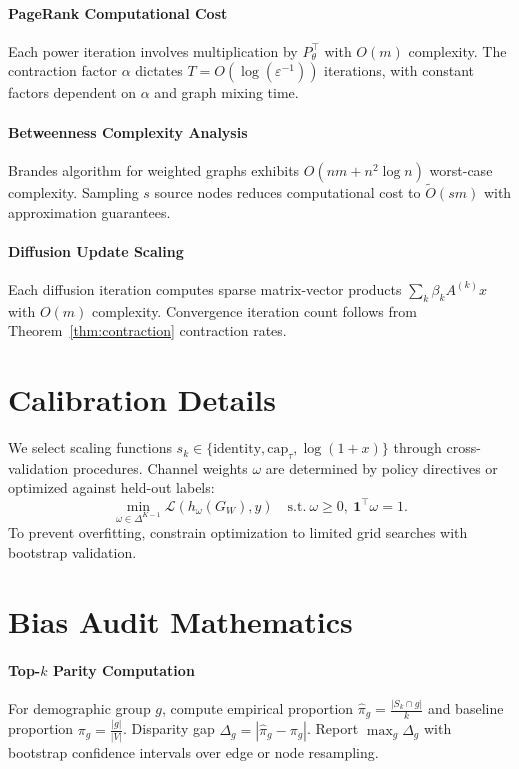 \documentclass[12pt]{article}
\theoremstyle{plain}
\begin{document}
\paragraph{PageRank Computational Cost}
Each power iteration involves multiplication by $P_\theta^\top$ with $O(m)$ complexity. The contraction factor $\alpha$ dictates $T=O(\log(\varepsilon^{-1}))$ iterations, with constant factors dependent on $\alpha$ and graph mixing time.

\paragraph{Betweenness Complexity Analysis}
Brandes algorithm for weighted graphs exhibits $O(nm+n^2\log n)$ worst-case complexity. Sampling $s$ source nodes reduces computational cost to $\tilde{O}(sm)$ with approximation guarantees.

\paragraph{Diffusion Update Scaling}
Each diffusion iteration computes sparse matrix-vector products $\sum_k \beta_k A^{(k)}x$ with $O(m)$ complexity. Convergence iteration count follows from Theorem~\ref{thm:contraction} contraction rates.

\section{Calibration Details}
\label{app:calibration}
We select scaling functions $s_k\in\{\text{identity},\text{cap}_\tau,\log(1+x)\}$ through cross-validation procedures. Channel weights $\omega$ are determined by policy directives or optimized against held-out labels:
\[
\min_{\omega\in\Delta^{K-1}} \mathcal{L}(h_\omega(G_W),y)\quad
\text{s.t.}\ \omega\ge0,\ \mathbf{1}^\top\omega=1.
\]
To prevent overfitting, constrain optimization to limited grid searches with bootstrap validation.

\section{Bias Audit Mathematics}
\label{app:bias-math}
\paragraph{Top-$k$ Parity Computation}
For demographic group $g$, compute empirical proportion $\hat{\pi}_g=\frac{|S_k\cap g|}{k}$ and baseline proportion $\pi_g=\frac{|g|}{|V|}$. Disparity gap $\Delta_g=|\hat{\pi}_g-\pi_g|$. Report $\max_g \Delta_g$ with bootstrap confidence intervals over edge or node resampling.
\end{document}
